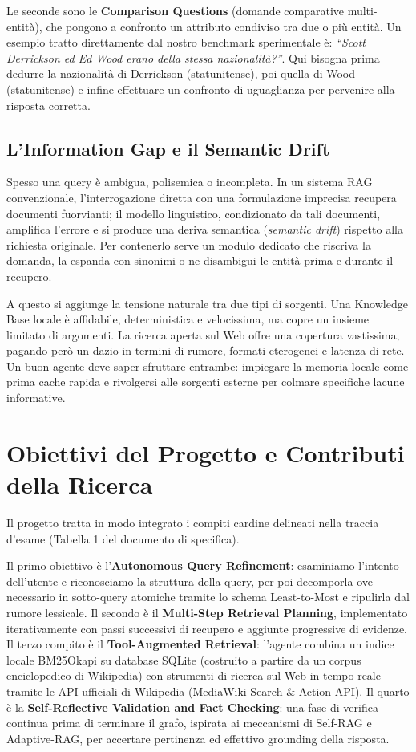 Le seconde sono le \textbf{Comparison Questions} (domande comparative multi-entità), che pongono a confronto un attributo condiviso tra due o più entità. Un esempio tratto direttamente dal nostro benchmark sperimentale è: \textit{``Scott Derrickson ed Ed Wood erano della stessa nazionalità?''}. Qui bisogna prima dedurre la nazionalità di Derrickson (statunitense), poi quella di Wood (statunitense) e infine effettuare un confronto di uguaglianza per pervenire alla risposta corretta.

\subsection{L'Information Gap e il Semantic Drift}
Spesso una query è ambigua, polisemica o incompleta. In un sistema RAG convenzionale, l'interrogazione diretta con una formulazione imprecisa recupera documenti fuorvianti; il modello linguistico, condizionato da tali documenti, amplifica l'errore e si produce una deriva semantica (\textit{semantic drift}) rispetto alla richiesta originale. Per contenerlo serve un modulo dedicato che riscriva la domanda, la espanda con sinonimi o ne disambigui le entità prima e durante il recupero.

A questo si aggiunge la tensione naturale tra due tipi di sorgenti. Una Knowledge Base locale è affidabile, deterministica e velocissima, ma copre un insieme limitato di argomenti. La ricerca aperta sul Web offre una copertura vastissima, pagando però un dazio in termini di rumore, formati eterogenei e latenza di rete. Un buon agente deve saper sfruttare entrambe: impiegare la memoria locale come prima cache rapida e rivolgersi alle sorgenti esterne per colmare specifiche lacune informative.

\section{Obiettivi del Progetto e Contributi della Ricerca}
\label{sec:obiettivi_contributi}

Il progetto tratta in modo integrato i compiti cardine delineati nella traccia d'esame (Tabella 1 del documento di specifica).

Il primo obiettivo è l'\textbf{Autonomous Query Refinement}: esaminiamo l'intento dell'utente e riconosciamo la struttura della query, per poi decomporla ove necessario in sotto-query atomiche tramite lo schema Least-to-Most e ripulirla dal rumore lessicale. Il secondo è il \textbf{Multi-Step Retrieval Planning}, implementato iterativamente con passi successivi di recupero e aggiunte progressive di evidenze. Il terzo compito è il \textbf{Tool-Augmented Retrieval}: l'agente combina un indice locale BM25Okapi su database SQLite (costruito a partire da un corpus enciclopedico di Wikipedia) con strumenti di ricerca sul Web in tempo reale tramite le API ufficiali di Wikipedia (MediaWiki Search \& Action API). Il quarto è la \textbf{Self-Reflective Validation and Fact Checking}: una fase di verifica continua prima di terminare il grafo, ispirata ai meccanismi di Self-RAG e Adaptive-RAG, per accertare pertinenza ed effettivo grounding della risposta.

